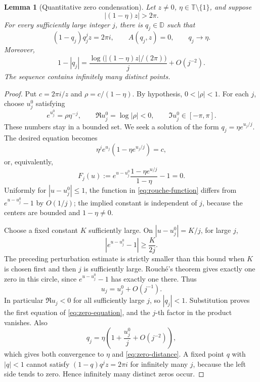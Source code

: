 \documentclass[11pt,a4paper]{article}
\numberwithin{equation}{section}
\newtheorem{lemma}[theorem]{Lemma}
\theoremstyle{definition}
\theoremstyle{remark}
\newcommand{\D}{\mathbb D}
\newcommand{\T}{\mathbb T}
\begin{document}
\begin{lemma}[Quantitative zero condensation]\label{lem:zeros}
Let \(z\ne0\), \(\eta\in\T\setminus\{1\}\), and suppose
\begin{equation}\label{eq:large-region}
 |(1-\eta)z|>2\pi.
\end{equation}
For every sufficiently large integer \(j\), there is \(q_j\in\D\) such that
\begin{equation}\label{eq:zero-equation}
 (1-q_j)q_j^jz=2\pi i,\qquad A(q_j,z)=0,\qquad q_j\longrightarrow\eta.
\end{equation}
Moreover,
\begin{equation}\label{eq:zero-distance}
 1-|q_j|=
 \frac{\log\bigl(|(1-\eta)z|/(2\pi)\bigr)}{j}+O(j^{-2}).
\end{equation}
The sequence contains infinitely many distinct points.
\end{lemma}
\begin{proof}
Put \(c=2\pi i/z\) and \(\rho=c/(1-\eta)\). By hypothesis, \(0<|\rho|<1\). For each \(j\), choose \(u_j^0\) satisfying
\[
 e^{u_j^0}=\rho\eta^{-j},\qquad
 \Re u_j^0=\log|\rho|<0,\qquad \Im u_j^0\in[-\pi,\pi].
\]
These numbers stay in a bounded set. We seek a solution of the form
\(q_j=\eta e^{u_j/j}\). The desired equation becomes
\[
 \eta^je^{u_j}(1-\eta e^{u_j/j})=c,
\]
or, equivalently,
\begin{equation}\label{eq:rouche-function}
 F_j(u):=e^{u-u_j^0}\frac{1-\eta e^{u/j}}{1-\eta}-1=0.
\end{equation}
Uniformly for \(|u-u_j^0|\le1\), the function in \eqref{eq:rouche-function} differs from \(e^{u-u_j^0}-1\) by \(O(1/j)\); the implied constant is independent of \(j\), because the centers are bounded and \(1-\eta\ne0\).

Choose a fixed constant \(K\) sufficiently large. On \(|u-u_j^0|=K/j\), for large \(j\),
\[
 |e^{u-u_j^0}-1|\ge\frac{K}{2j}.
\]
The preceding perturbation estimate is strictly smaller than this bound when \(K\) is chosen first and then \(j\) is sufficiently large. Rouch\'e's theorem gives exactly one zero in this circle, since \(e^{u-u_j^0}-1\) has exactly one there. Thus
\[
 u_j=u_j^0+O(j^{-1}).
\]
In particular \(\Re u_j<0\) for all sufficiently large \(j\), so \(|q_j|<1\). Substitution proves the first equation of \eqref{eq:zero-equation}, and the \(j\)-th factor in the product vanishes. Also
\[
 q_j=\eta\left(1+\frac{u_j^0}{j}+O(j^{-2})\right),
\]
which gives both convergence to \(\eta\) and \eqref{eq:zero-distance}. A fixed point \(q\) with \(|q|<1\) cannot satisfy \((1-q)q^jz=2\pi i\) for infinitely many \(j\), because the left side tends to zero. Hence infinitely many distinct zeros occur.
\end{proof}
\end{document}
